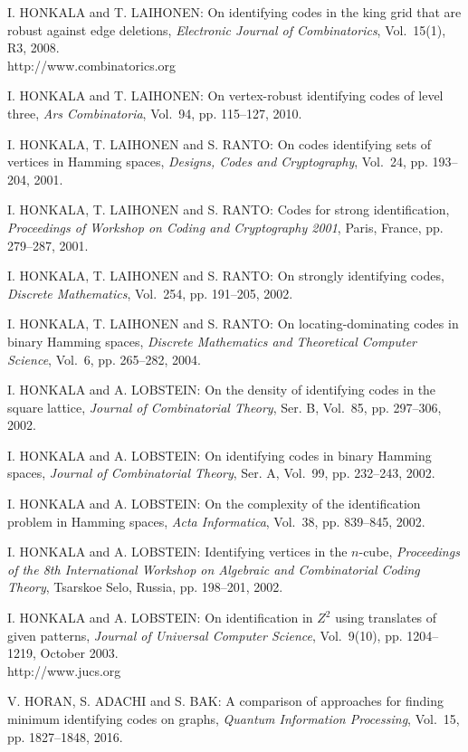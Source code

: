 \begin{thebibliography}{999}
I. HONKALA and T. LAIHONEN: On identifying codes in the king grid that are robust against edge deletions, {\it Electronic Journal of Combinatorics}, Vol.~15(1), R3, 2008.\\
http://www.combinatorics.org

I. HONKALA and T. LAIHONEN: On vertex-robust identifying codes of level three, {\it Ars Combinatoria}, Vol.~94, pp. 115--127, 2010.

I. HONKALA, T. LAIHONEN and S. RANTO: On codes identifying sets of vertices in Hamming spaces, {\it Designs, Codes and Cryptography}, Vol.~24, pp. 193--204, 2001.

I. HONKALA, T. LAIHONEN and S. RANTO: Codes for strong identification, {\it Proceedings of Workshop on Coding and Cryptography 2001}, Paris, France, pp. 279--287, 2001.

I. HONKALA, T. LAIHONEN and S. RANTO: On strongly identifying codes, {\it Discrete Mathematics}, Vol.~254, pp. 191--205, 2002.

I. HONKALA, T. LAIHONEN and S. RANTO: On locating-dominating codes in binary Hamming spaces, {\it Discrete Mathematics and Theoretical Computer Science}, Vol.~6, pp. 265--282, 2004.

I. HONKALA and A. LOBSTEIN: On the density of identifying codes in the square lattice, {\it Journal of Combinatorial Theory}, Ser. B, Vol.~85, pp. 297--306, 2002.

I. HONKALA and A. LOBSTEIN: On identifying codes in binary Hamming spaces, {\it Journal of Combinatorial Theory}, Ser. A, Vol.~99, pp. 232--243, 2002.

I. HONKALA and A. LOBSTEIN: On the complexity of the identification problem in Hamming spaces, {\it Acta Informatica}, Vol.~38, pp. 839--845, 2002.

I. HONKALA and A. LOBSTEIN: Identifying vertices in the $n$-cube, {\it Proceedings of the 8th International Workshop on Algebraic and Combinatorial Coding Theory}, Tsarskoe Selo, Russia, pp. 198--201, 2002.

I. HONKALA and A. LOBSTEIN: On identification in $Z^2$ using translates of given patterns, {\it Journal of Universal Computer Science}, Vol.~9(10), pp. 1204--1219, October 2003.\\
http://www.jucs.org

V. HORAN, S. ADACHI and S. BAK: A comparison of approaches for finding minimum identifying codes on graphs, {\it Quantum Information Processing}, Vol.~15, pp. 1827--1848, 2016.


\end{thebibliography}
